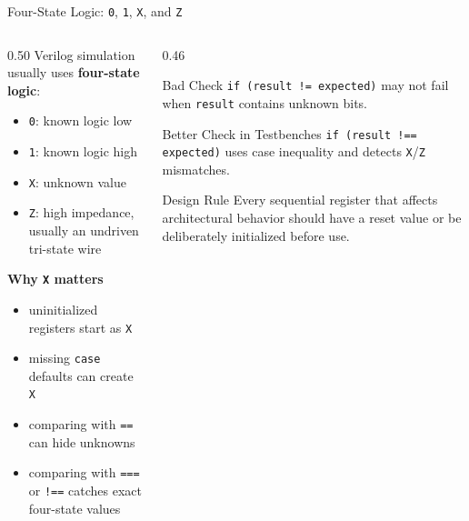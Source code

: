 \documentclass[aspectratio=169,10pt]{beamer}
\begin{document}
\begin{frame}{Four-State Logic: \texttt{0}, \texttt{1}, \texttt{X}, and \texttt{Z}}
  \begin{columns}[T]
    \begin{column}{0.50\textwidth}
      Verilog simulation usually uses \textbf{four-state logic}:
      \begin{itemize}
        \item \texttt{0}: known logic low
        \item \texttt{1}: known logic high
        \item \texttt{X}: unknown value
        \item \texttt{Z}: high impedance, usually an undriven tri-state wire
      \end{itemize}

      \vspace{0.8em}
      \textbf{Why \texttt{X} matters}
      \begin{itemize}
        \item uninitialized registers start as \texttt{X}
        \item missing \texttt{case} defaults can create \texttt{X}
        \item comparing with \texttt{==} can hide unknowns
        \item comparing with \texttt{===} or \texttt{!==} catches exact four-state values
      \end{itemize}
    \end{column}
    \begin{column}{0.46\textwidth}
      \begin{block}{Bad Check}
        \texttt{if (result != expected)} may not fail when \texttt{result} contains unknown bits.
      \end{block}

      \vspace{0.7em}
      \begin{exampleblock}{Better Check in Testbenches}
        \texttt{if (result !== expected)} uses case inequality and detects \texttt{X}/\texttt{Z} mismatches.
      \end{exampleblock}

      \vspace{0.7em}
      \begin{alertblock}{Design Rule}
        Every sequential register that affects architectural behavior should have a reset value or be deliberately initialized before use.
      \end{alertblock}
    \end{column}
  \end{columns}
\end{frame}
\end{document}
